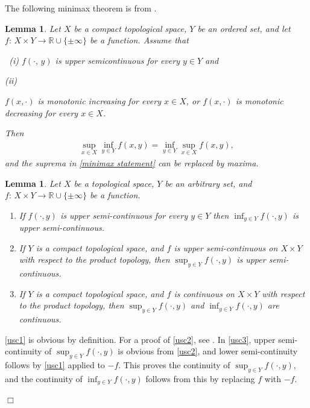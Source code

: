 \documentclass[unsortedaddress,superscriptaddress,pra,notitlepage]{revtex4}
\newtheorem{lemma}[definition]{Lemma}
\newenvironment{proof}[1][Proof]{\begin{trivlist}
\item[\hskip \labelsep {\bfseries #1}]}{\hfill$\Box$\end{trivlist}}
\def\bR{\mathbb{R}}
\def\valt{\cdot}
\newcommand{\s}{\mbox{ }}
\begin{document}
\medskip

The following minimax theorem is from \cite[Corollary A.2]{MH}.
\begin{lemma}\label{lemma:minimax2}
Let $X$ be a compact topological space, $Y$ be an ordered set, and let $f:\,X\times Y\to \bR\cup\{\pm\infty\}$ be a function. Assume that
\smallskip

\s(i) $f(\valt,\,y)$ is upper semicontinuous for every $y\in Y$ and
\smallskip

(ii) \begin{minipage}[t]{15cm}
$f(x,\valt)$ is monotonic increasing for every $x\in X$, or
$f(x,\valt)$ is monotonic decreasing for every $x\in X$.
\end{minipage}
\smallskip

\noindent Then 
\begin{align}\label{minimax statement}
\sup_{x\in X}\inf_{y\in Y}f(x,y)=
\inf_{y\in Y}\sup_{x\in X}f(x,y),
\end{align}
and the suprema in \eqref{minimax statement} can be replaced by maxima.
\end{lemma}

\begin{lemma}\label{lemma:usc}
Let $X$ be a topological space, $Y$ be an arbitrary set, and 
$f:\,X\times Y\to\bR\cup\{\pm\infty\}$ be a function.
\begin{enumerate}
\item\label{usc1}
If $f(\valt,y)$ is upper semi-continuous for every $y\in Y$ then $\inf_{y\in Y}f(\valt,y)$ is upper semi-continuous.

\item\label{usc2}
If $Y$ is a compact topological space, and $f$ is upper semi-continuous on $X\times Y$ with respect to the product topology, then 
$\sup_{y\in Y}f(\valt,y)$ is upper semi-continuous.

\item\label{usc3}
If $Y$ is a compact topological space, and $f$ is continuous on $X\times Y$ with respect to the product topology, then 
$\sup_{y\in Y}f(\valt,y)$ and
$\inf_{y\in Y}f(\valt,y)$ 
are continuous.
\end{enumerate}
\end{lemma}
\begin{proof}
\ref{usc1} is obvious by definition. For a proof of 
\ref{usc2}, see \cite{BaryRenyi}.
In \ref{usc3}, upper semi-continuity 
of $\sup_{y\in Y}f(\valt,y)$
is obvious from \ref{usc2}, and lower semi-continuity 
follows by \ref{usc1} applied to $-f$.
This proves the continuity of $\sup_{y\in Y}f(\valt,y)$, and the continuity of 
$\inf_{y\in Y}f(\valt,y)$ follows from this by replacing $f$ with $-f$.

\end{proof}
\medskip
\end{document}
